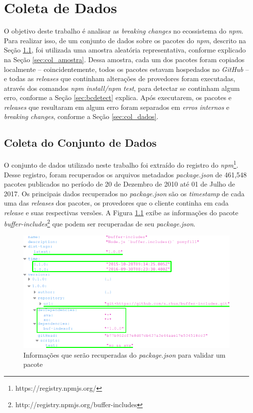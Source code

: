 \chapter{Coleta de Dados}
\label{cap:metodologia}

O objetivo deste trabalho é analisar as \textit{breaking changes} no ecossistema do \textit{npm}. Para realizar isso, de um conjunto de dados sobre os pacotes do \textit{npm}, descrito na Seção \ref{sec:col_base}, foi utilizada uma amostra aleatória representativa, conforme explicado na Seção \ref{sec:col_amostra}. Dessa amostra, cada um dos pacotes foram copiados localmente -- coincidentemente, todos os pacotes estavam hospedados no \textit{GitHub} -- e todas as \textit{releases} que continham alterações de provedores foram executadas, através dos comandos \textit{npm install/npm test}, para detectar se continham algum erro, conforme a Seção \ref{sec:bcdetect} explica. Após executarem, os pacotes e \textit{releases} que resultaram em algum erro foram separados em \textit{erros internos} e \textit{breaking changes}, conforme a Seção \ref{sec:col_dados}.

\section{Coleta do Conjunto de Dados}
\label{sec:col_base}
O conjunto de dados utilizado neste trabalho foi extraído do registro do \textit{npm}\footnote{https://registry.npmjs.org/}. Desse registro, foram recuperados os arquivos metadados \textit{package.json} de 461,548 pacotes publicados no período de 20 de Dezembro de 2010 até 01 de Julho de 2017. Os principais dados recuperados no \textit{package.json} são os \textit{timestamp} de cada uma das \textit{releases} dos pacotes, os provedores que o cliente continha em cada \textit{release} e suas respectivas versões. A Figura \ref{fig:package_json} exibe as informações do pacote \textit{buffer-includes}\footnote{http://registry.npmjs.org/buffer-includes} que podem ser recuperadas de seu \textit{package.json}.

\begin{figure}
    \centering
    \includegraphics[scale=0.5]{figuras/package_json.png}
    \caption{Informações que serão recuperadas do \textit{package.json} para validar um pacote}
    \label{fig:package_json}
\end{figure}{}

